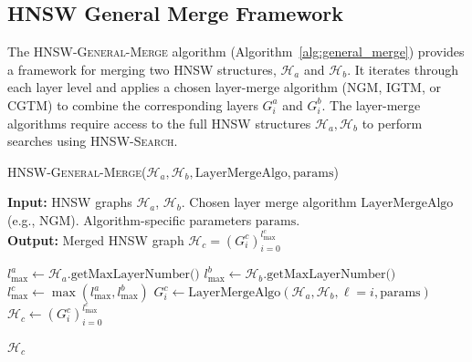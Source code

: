 \documentclass{article}
\begin{document}
\subsection{HNSW General Merge Framework}

The \textsc{HNSW-General-Merge} algorithm (Algorithm~\ref{alg:general_merge}) provides a framework for merging two HNSW structures, $\mathcal{H}_a$ and $\mathcal{H}_b$. It iterates through each layer level and applies a chosen layer-merge algorithm (\textsc{NGM}, \textsc{IGTM}, or \textsc{CGTM}) to combine the corresponding layers $G^a_i$ and $G^b_i$. The layer-merge algorithms require access to the full HNSW structures $\mathcal{H}_a, \mathcal{H}_b$ to perform searches using \textsc{HNSW-Search}.


\begin{algorithm}
\caption{\textsc{HNSW-General-Merge}($\mathcal{H}_a, \mathcal{H}_b, \text{LayerMergeAlgo}, \text{params}$)}\label{alg:general_merge}
\textbf{Input:} HNSW graphs $\mathcal{H}_a$, $\mathcal{H}_b $. Chosen layer merge algorithm $\text{LayerMergeAlgo}$ (e.g., \textsc{NGM}). Algorithm-specific parameters $\text{params}$. \\
\textbf{Output:} Merged HNSW graph $\mathcal{H}_c = (G^c_i)_{i=0}^{l_{\max}^c}$
\begin{algorithmic}[1]
\State $l_{\max}^a \gets \mathcal{H}_a.\text{getMaxLayerNumber()}$
\State $l_{\max}^b \gets \mathcal{H}_b.\text{getMaxLayerNumber()}$
\State $l_{\max}^c \gets \max(l_{\max}^a, l_{\max}^b)$
     
    \State $G^c_i \gets \text{LayerMergeAlgo}(\mathcal{H}_a, \mathcal{H}_b, \ell=i, \text{params})$ 
\EndFor
\State $\mathcal{H}_c \gets (G^c_i)_{i=0}^{l_{\max}^c}$ %

\State \Return $\mathcal{H}_c$
\end{algorithmic}
\end{algorithm}


\end{document}
